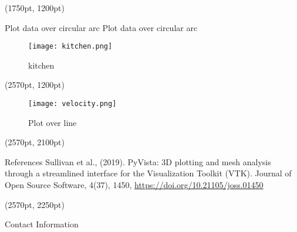\documentclass[final]{beamer}
\begin{document}
\begin{frame}[fragile]
\begin{textblock*}{800pt}(1750pt, 1200pt)
\begin{block}{Plot data over circular arc}
Plot data over circular arc
\begin{figure}
\texttt{[image: kitchen.png]}
\caption{kitchen}
\end{figure}
\end{block}
\end{textblock*}

\begin{textblock*}{800pt}(2570pt, 1200pt)

\begin{figure}
\texttt{[image: velocity.png]}
\caption{Plot over line}
\end{figure}
\end{textblock*}

\begin{textblock*}{800pt}(2570pt, 2100pt)
\begin{block}{References}
Sullivan et al., (2019). PyVista: 3D plotting and mesh analysis through a streamlined interface for the Visualization Toolkit (VTK). Journal of Open Source Software, 4(37), 1450, \url{https://doi.org/10.21105/joss.01450}
\end{block}
\end{textblock*}

\begin{textblock*}{800pt}(2570pt, 2250pt)
\begin{block}{Contact Information}
\end{block}
\doclicenseThis
\end{textblock*}

\end{frame}
\end{document}
